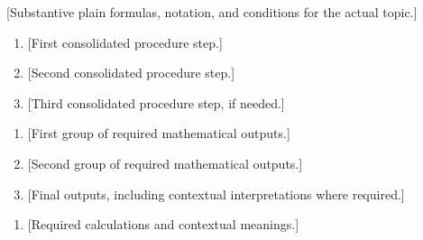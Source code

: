 [Substantive plain formulas, notation, and conditions for the actual topic.]
\begin{enumerate}[label=\arabic*.,itemsep=2pt]
\item {[First consolidated procedure step.]}
\item {[Second consolidated procedure step.]}
\item {[Third consolidated procedure step, if needed.]}
\end{enumerate}\par
\noindent\begin{minipage}[t]{.49\linewidth}
\vspace{0pt}
\end{minipage}\hfill
\begin{minipage}[t]{.49\linewidth}
\vspace{0pt}
\end{minipage}\par

\begin{enumerate}[label=\arabic*.,itemsep=2pt]
\item {[First group of required mathematical outputs.]}
\item {[Second group of required mathematical outputs.]}
\item {[Final outputs, including contextual interpretations where required.]}
\end{enumerate}
\begin{enumerate}[label=\arabic*.,itemsep=2pt]
\item {[Required calculations and contextual meanings.]}
\end{enumerate}

